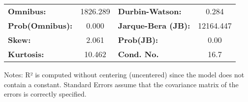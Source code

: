 \begin{center}
\begin{tabular}{lcccccc}
\bottomrule
\end{tabular}
\begin{tabular}{lclc}
\textbf{Omnibus:}       & 1826.289 & \textbf{  Durbin-Watson:     } &     0.284  \\
\textbf{Prob(Omnibus):} &   0.000  & \textbf{  Jarque-Bera (JB):  } & 12164.447  \\
\textbf{Skew:}          &   2.061  & \textbf{  Prob(JB):          } &      0.00  \\
\textbf{Kurtosis:}      &  10.462  & \textbf{  Cond. No.          } &      16.7  \\
\bottomrule
\end{tabular}
\end{center}

Notes: \newline
 [1] R² is computed without centering (uncentered) since the model does not contain a constant. \newline
 [2] Standard Errors assume that the covariance matrix of the errors is correctly specified.